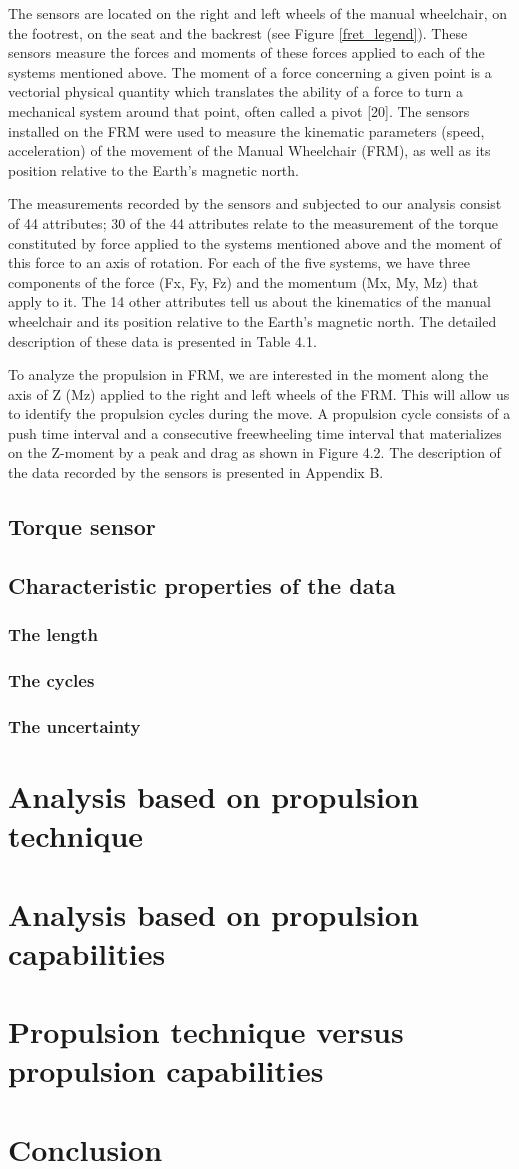 The sensors are located on the right and left wheels of the manual wheelchair, on the footrest, on the seat and the backrest (see Figure \ref{fret_legend}). These sensors measure the forces and moments of these forces applied to each of the systems mentioned above.  The moment of a force concerning a given point is a vectorial physical quantity which translates the ability of a force to turn a mechanical system around that point, often called a pivot [20]. The sensors installed on the FRM were used to measure the kinematic parameters (speed, acceleration) of the movement of the Manual Wheelchair (FRM), as well as its position relative to the Earth's magnetic north.

The measurements recorded by the sensors and subjected to our analysis consist of 44 attributes; 30 of the 44 attributes relate to the measurement of the torque constituted by force applied to the systems mentioned above and the moment of this force to an axis of rotation. For each of the five systems, we have three components of the force (Fx, Fy, Fz) and the momentum (Mx, My, Mz) that apply to it. The 14 other attributes tell us about the kinematics of the manual wheelchair and its position relative to the Earth's magnetic north. The detailed description of these data is presented in Table 4.1.

To analyze the propulsion in FRM, we are interested in the moment along the axis of Z (Mz) applied to the right and left wheels of the FRM. This will allow us to identify the propulsion cycles during the move. A propulsion cycle consists of a push time interval and a consecutive freewheeling time interval that materializes on the Z-moment by a peak and drag as shown in Figure 4.2. The description of the data recorded by the sensors is presented in Appendix B.

\subsection{Torque sensor}
\subsection{Characteristic properties of the data}
\subsubsection{The length}
\subsubsection{The cycles}
\subsubsection{The uncertainty}
\section{Analysis based on propulsion technique}
\section{Analysis based on propulsion capabilities}
\section{Propulsion technique versus propulsion capabilities}
\section{Conclusion}


